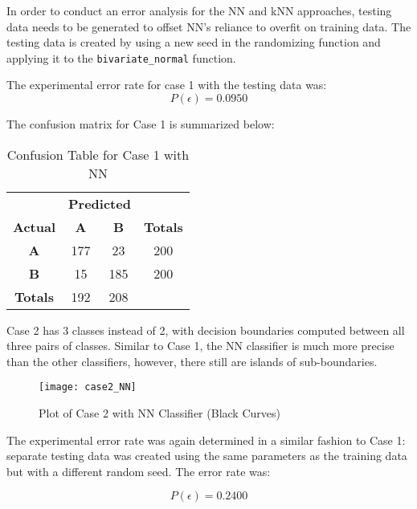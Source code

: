 \documentclass{article}
\begin{document}
In order to conduct an error analysis for the NN and kNN approaches, testing data needs to be generated to offset NN's reliance to overfit on training data. The testing data is created by using a new seed in the randomizing function and applying it to the \verb|bivariate_normal| function.

The experimental error rate for case 1 with the testing data was:
\begin{equation}
    P(\epsilon) = 0.0950
\end{equation}

The confusion matrix for Case 1 is summarized below:
\begin{table}[H]
    \centering
    \begin{tabular}{c|c c|c|}
        & \multicolumn{2}{c|}{\textbf{Predicted}} \\
        \textbf{Actual} & \textbf{A} & \textbf{B} & \textbf{Totals} \\
        \hline
        \textbf{A} & 177 \cellcolor[gray]{.8} & 23 & 200\\
        \textbf{B} & 15 & 185 \cellcolor[gray]{.8} & 200\\\hline
        \textbf{Totals} & 192 & 208\\
        \cline{1-3}
    \end{tabular}
    \caption{Confusion Table for Case 1 with NN}
    \label{tab:Case1_NN_error}
\end{table}

Case 2 has 3 classes instead of 2, with decision boundaries computed between all three pairs of classes. Similar to Case 1, the NN classifier is much more precise than the other classifiers, however, there still are islands of sub-boundaries.

\begin{figure}[H]
\caption{Plot of Case 2 with NN Classifier (Black Curves)}
\centering
\texttt{[image: case2\_NN]}
\label{fig:Case2_NN}
\end{figure}

The experimental error rate was again determined in a similar fashion to Case 1: separate testing data was created using the same parameters as the training data but with a different random seed. The error rate was:

\begin{equation}
    P(\epsilon) = 0.2400
\end{equation}
\end{document}
